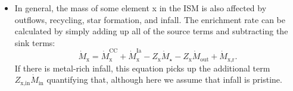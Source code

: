 \documentclass[ms.tex]{subfiles}
\begin{document}
\begin{itemize}
	\item In general, the mass of some element x in the ISM is also affected by
	outflows, recycling, star formation, and infall.
	The enrichment rate can be calculated by simply adding up all of the source
	terms and subtracting the sink terms:
	\begin{equation}
	\label{eq:enrichment_eq}
	\dot{M}_\text{x} = \dot{M}_\text{x}^\text{CC} + \dot{M}_\text{x}^\text{Ia}
	- Z_\text{x}\dot{M}_\star - Z_\text{x}\dot{M}_\text{out} +
	\dot{M}_\text{x,r}.
	\end{equation}
	If there is metal-rich infall, this equation picks up the additional term
	$Z_\text{x,in}\dot{M}_\text{in}$ quantifying that, although here we assume
	that infall is pristine.





\end{itemize}
\end{document}
